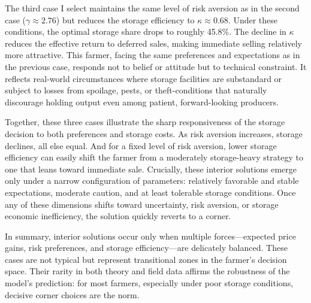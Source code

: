 The third case I select maintains the same level of risk aversion as in the second case ($\gamma \approx 2.76$) but reduces the storage efficiency to $\kappa \approx 0.68$. Under these conditions, the optimal storage share drops to roughly 45.8\%. The decline in $\kappa$ reduces the effective return to deferred sales, making immediate selling relatively more attractive. This farmer, facing the same preferences and expectations as in the previous case, responds not to belief or attitude but to technical constraint. It reflects real-world circumstances where storage facilities are substandard or subject to losses from spoilage, pests, or theft-conditions that naturally discourage holding output even among patient, forward-looking producers.

Together, these three cases illustrate the sharp responsiveness of the storage decision to both preferences and storage costs. As risk aversion increases, storage declines, all else equal. And for a fixed level of risk aversion, lower storage efficiency can easily shift the farmer from a moderately storage-heavy strategy to one that leans toward immediate sale. Crucially, these interior solutions emerge only under a narrow configuration of parameters: relatively favorable and stable expectations, moderate caution, and at least tolerable storage conditions. Once any of these dimensions shifts toward uncertainty, risk aversion, or storage economic inefficiency, the solution quickly reverts to a corner.

In summary, interior solutions occur only when multiple forces---expected price gains, risk preferences, and storage efficiency---are delicately balanced. These cases are not typical but represent transitional zones in the farmer's decision space. Their rarity in both theory and field data affirms the robustness of the model's prediction: for most farmers, especially under poor storage conditions, decisive corner choices are the norm.




